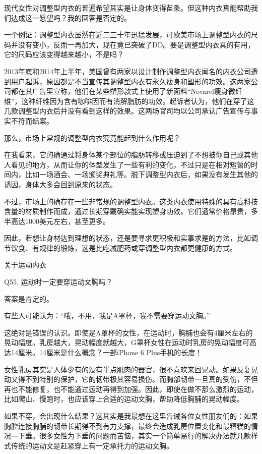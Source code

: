 \documentclass[12pt,UTF8]{ctexbook}
\begin{document}
现代女性对调整型内衣的普遍希望其实是让身体变得苗条。但这种内衣真能帮助我们达成这一愿望吗？我的回答是否定的。

一个例证：调整型内衣虽然在近二三十年迅猛发展，可欧美市场上调整型内衣的尺码并没有变小，反而一再加大，现在竟已突破了DD。要是调整型内衣真的有用，它的尺码应该变得越来越小，不是吗？

2013年底和2014年上半年，美国曾有两家以设计制作调整型内衣闻名的内衣公司遭到用户起诉，原因都是不当宣传其调整型内衣有永久瘦身和塑形的功效。这两家公司都在其广告里宣称，他们在某些塑形款式上使用了新面料“Novarel瘦身微纤维”，这种纤维因为含有咖啡因而有消解脂肪的功效。起诉者认为，他们在穿了这几款调整型内衣后并没有看到这样的效果。这两场官司均以公司承认广告宣传与事实不符而结案。

那么，市场上常规的调整型内衣究竟能起到什么作用呢？

在我看来，它的确通过将身体某个部位的脂肪转移或压迫到了不想被你自己或其他人看见的地方，从而让你的体型发生了一些有利的变化，不过只是在相对短暂的时间内，比如一场酒会、一场颁奖典礼等。脱下调整型内衣后，如果没有发生其他的诱因，身体大多会回到原来的状态。

不过，市场上的确存在一些非常规的调整型内衣。这类内衣使用特殊的具有高科技含量的材质制作而成，通过长期穿戴确实能实现塑身功效。它们通常价格昂贵，多半高达1000美元左右，甚至更多。

因此，若想让身材达到理想的状态，还是要寻求更积极和实事求是的方法，比如调节饮食、有规律的锻炼，这是比吃减肥药或穿调整型内衣都更健康的方式。





关于运动内衣


Q55. 运动时一定要穿运动文胸吗？


答案是肯定的。

有些人可能认为：“哦，不用，我是A罩杯，我不需要穿运动文胸。”

这绝对是错误的认识。即使是A罩杯的女性，在运动时，胸脯也会有4厘米左右的晃动幅度。乳房越大，晃动幅度就越大，G罩杯女性在运动时乳房的晃动幅度可高达14厘米。14厘米是什么概念？一部iPhone 6 Plus手机的长度！

女性乳房其实是人体少有的没有半点肌肉的器官，很不喜欢来回晃动。如果反复晃动又得不到特别的保护，它的韧带极其容易损伤。而胸部韧带一旦真的受伤，不但再也不能修复，也不能通过运动再得到加强。因此，即使在做不那么激烈的运动，比如爬山、慢跑时，也应该穿上合适的运动文胸，帮助降低胸脯的晃动幅度。

如果不穿，会出现什么结果？这其实是我最想在这里告诫各位女性朋友们的：如果胸腔连接胸脯的韧带长期得不到有力支撑，最终会造成乳房位置变化和最糟糕的情况—下垂。很多女性为下垂的问题而苦恼，其实一个简单易行的解决办法就几款样式传统的运动文是赶紧穿上有一定承托力的运动文胸。
\end{document}
